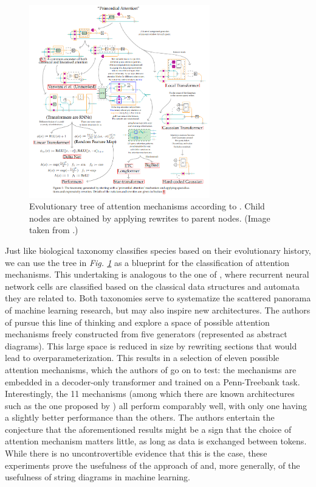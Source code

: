 \documentclass[11pt,a4paper,openright,twoside]{report}
\theoremstyle{plain}
\theoremstyle{definition}
\begin{document}
\begin{figure}[h]
  \begin{center}
    \includegraphics[width=0.7\textwidth]{figures/attention_tree.png}
    \caption[Tree of attention]{Evolutionary tree of attention mechanisms according to \cite{khatri2024anatomy}. Child nodes are obtained by applying rewrites to parent nodes. (Image taken from \cite{khatri2024anatomy}.)}
    \label{fig: attentiontree}
  \end{center}
\end{figure}

Just like biological taxonomy classifies species based on their evolutionary history, we can use the tree in \textit{Fig. \ref{fig: attentiontree}} as a blueprint for the classification of attention mechanisms. This undertaking is analogous to the one of \cite{gavranovicposition}, where recurrent neural network cells are classified based on the classical data structures and automata they are related to. Both taxonomies serve to systematize the scattered panorama of machine learning research, but may also inspire new architectures. The authors of \cite{khatri2024anatomy} pursue this line of thinking and explore a space of possible attention mechanisms freely constructed from five generators (represented as abstract diagrams). This large space is reduced in size by rewriting sections that would lead to overparameterization. This results in a selection of eleven possible attention mechanisms, which the authors of \cite{khatri2024anatomy} go on to test: the mechanisms are embedded in a decoder-only transformer and trained on a Penn-Treebank task. Interestingly, the 11 mechanisms (among which there are known architectures such as the one proposed by \cite{vaswani2017attention}) all perform comparably well, with only one having a slightly better performance than the others. The authors entertain the conjecture that the aforementioned results might be a sign that the choice of attention mechanism matters little, as long as data is exchanged between tokens. While there is no uncontrovertible evidence that this is the case, these experiments prove the usefulness of the approach of \cite{khatri2024anatomy} and, more generally, of the usefulness of string diagrams in machine learning.
\end{document}

